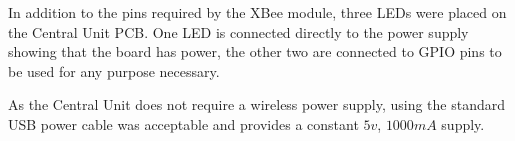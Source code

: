 In addition to the pins required by the XBee module, three LEDs were placed on the Central Unit PCB. One LED is connected directly to the power supply showing that the board has power, the other two are connected to GPIO pins to be used for any purpose necessary.

As the Central Unit does not require a wireless power supply, using the standard USB power cable was acceptable and provides a constant $5v$, $1000mA$ supply.
